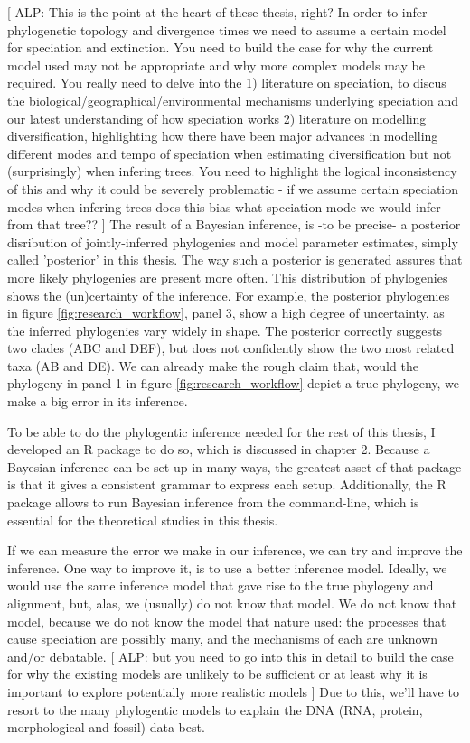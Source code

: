 [  
  ALP: This is the point at the heart of these thesis, right? 
  In order to infer phylogenetic topology and divergence times 
  we need to assume a certain model for speciation and extinction. 
  You need to build the case for why the current model used 
  may not be appropriate and why more complex models may be required. 
  You really need to delve into the 1) literature on speciation, 
  to discus the biological/geographical/environmental mechanisms 
  underlying speciation and our latest understanding of how speciation works 
  2) literature on modelling diversification, highlighting 
  how there have been major advances in modelling different modes and tempo 
  of speciation when estimating diversification 
  but not (surprisingly) when infering trees. 
  You need to highlight the logical inconsistency of this 
  and why it could be severely problematic - if we assume certain speciation 
  modes when infering trees does this bias what speciation mode 
  we would infer from that tree??  
]
The result of a Bayesian inference, is -to be precise- a posterior
disribution of jointly-inferred phylogenies and model parameter estimates,
simply called 'posterior' in this thesis.
The way such a posterior is generated assures that more likely phylogenies 
are present more often. 
This distribution of phylogenies shows the
(un)certainty of the inference.
For example, the posterior phylogenies in figure \ref{fig:research_workflow},
panel 3, show a high degree of uncertainty, as the
inferred phylogenies vary widely in shape. The posterior correctly
suggests two clades (ABC and DEF), but does not confidently show
the two most related taxa (AB and DE). We can already make 
the rough claim that, would the phylogeny in panel 1 
in figure \ref{fig:research_workflow} depict
a true phylogeny, we make a big error in its inference.

To be able to do the phylogentic inference needed for the rest of this
thesis, I developed an R package to do so, which
is discussed in chapter 2. Because a Bayesian inference can be set up in
many ways, the greatest asset of that package is that it gives a
consistent grammar to express each setup. Additionally, the R package allows
to run Bayesian inference from the command-line, which is essential for
the theoretical studies in this thesis.

If we can measure the error we make in our inference, 
we can try and improve the inference. 
One way to improve it, is to use a better inference model.
Ideally, we would use the same inference model that gave rise to
the true phylogeny and alignment, but, alas, 
we (usually) do not know that model.
We do not know that model, because we do not know the
model that nature used: the
processes that cause speciation are possibly many, and 
the mechanisms of each are unknown and/or debatable.
[
  ALP: but you need to go into this in detail to build the case for 
  why the existing models are unlikely to be sufficient or at least 
  why it is important to explore potentially more realistic models
]
Due to this, we'll have to resort to the many phylogentic models 
to explain the DNA (RNA, protein, morphological and fossil) data best.


